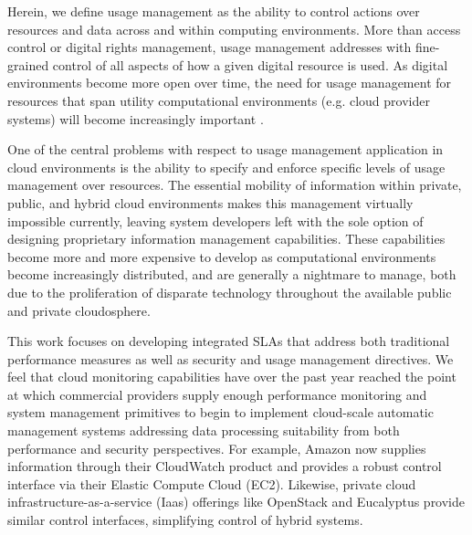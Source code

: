 \documentclass{sig-alternate}
\begin{document}
Herein, we define usage management as the ability to control actions over resources and data across and within computing environments.  More than access control or digital rights management, usage management addresses with fine-grained control of all aspects of how a given digital resource is used.  As digital environments become more open over time, the need for usage management for resources that span utility computational environments (e.g. cloud provider systems) will become increasingly important \cite{ctrl:lamb-MCCCS,ctrl:lamb-SOSE}.

One of the central problems with respect to usage management application in cloud environments is the ability to specify and enforce specific levels of usage management over resources.  The essential mobility of information within private, public, and hybrid cloud environments makes this management virtually impossible currently, leaving system developers left with the sole option of designing proprietary information management capabilities.  These capabilities become more and more expensive to develop as computational environments become increasingly distributed, and are generally a nightmare to manage, both due to the proliferation of disparate technology throughout the available public and private cloudosphere. 


This work focuses on developing integrated SLAs that address both traditional performance measures as well as security and usage management directives.  We feel that cloud monitoring capabilities have over the past year reached the point at which commercial providers supply enough performance monitoring and system management primitives to begin to implement cloud-scale automatic management systems addressing data processing suitability from both performance and security perspectives.  For example, Amazon now supplies information through their CloudWatch product and provides a robust control interface via their Elastic Compute Cloud (EC2).  Likewise, private cloud infrastructure-as-a-service (Iaas) offerings like OpenStack and Eucalyptus provide similar control interfaces, simplifying control of hybrid systems.
\end{document}
